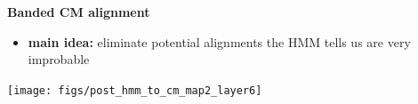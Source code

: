 \documentclass[landscape]{slides}
\begin{document}
\begin{slide}
\begin{center}
\large
\textbf{Banded CM alignment}
\end{center}
\medskip
\small
\begin{itemize}
\item
\textbf{main idea:} eliminate potential alignments the HMM tells us are very improbable
\end{itemize}
\begin{center}
\texttt{[image: figs/post\_hmm\_to\_cm\_map2\_layer6]}
\end{center}
\vfill
\end{slide}
\end{document}

